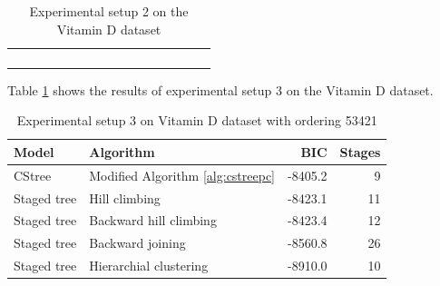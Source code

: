 \documentclass{tufte-book}
\begin{document}
\begin{table}[]
\begin{tabular}{cccccccccccccccc}
                        &                                                                                               &                             &                              &                             &                              &                                 &                              &                             &                                       &                             &                              &  &  &  &  \\
                        &                                                                                               &                             &                              &                             &                              &                                 &                              &                             &                                       &                             & \textbf{}                    &  &  &  &  \\
                        &                                                                                               &                             &                              &                             &                              &                                 &                              &                             &                                       &                             &                              &  &  &  &  \\
                        &                                                                                               &                             &                              &                             &                              &                                 &                              &                             &                                       &                             &                              &  &  &  & 

\caption{Experimental setup 2 on the Vitamin D dataset}
			\end{tabular}
\end{table}

Table \ref{tab:org4e2451a} shows the results of experimental setup 3 on the Vitamin D dataset.

\begin{table}[htbp]
\caption{\label{tab:org4e2451a}Experimental setup 3 on Vitamin D dataset with ordering 53421}
\centering
\begin{tabular}{l|l|r|r}
\hline
Model & Algorithm & BIC & Stages\\
\hline
CStree & Modified Algorithm \ref{alg:cstreepc} & -8405.2 & 9\\
Staged tree & Hill climbing & -8423.1 & 11\\
Staged tree & Backward hill climbing & -8423.4 & 12\\
Staged tree & Backward joining & -8560.8 & 26\\
Staged tree & Hierarchial clustering & -8910.0 & 10\\
\end{tabular}
\end{table}
\end{document}
